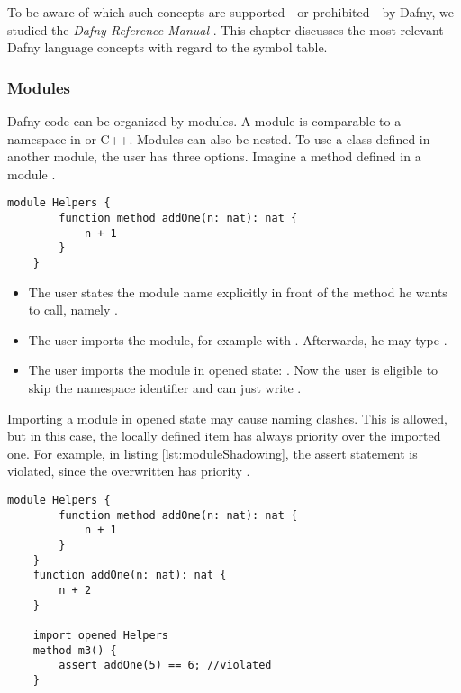 To be aware of which such concepts are supported - or prohibited - by Dafny, we studied the \textit{Dafny Reference Manual} \cite{dafnyReferenceManual}.
This chapter discusses the most relevant Dafny language concepts with regard to the symbol table.

\subsubsection{Modules}
Dafny code can be organized by modules.
A module is comparable to a namespace in \CsharpWithSpace or C++.
Modules can also be nested.
To use a class defined in another module, the user has three options.
Imagine a method  defined in a module .

\begin{lstlisting}[language=dafny, caption={Module Example}, captionpos=b, label={lst:addOneMethod}]
    module Helpers {
        function method addOne(n: nat): nat {
            n + 1
        }
    }
\end{lstlisting}

\begin{itemize}
    \item The user states the module name explicitly in front of the method he wants to call, \linebreak namely .
    \item The user imports the module, for example with .
    Afterwards, he may type .
    \item The user imports the module in opened state: .
    Now the user is eligible to skip the namespace identifier and can just write .
\end{itemize}

Importing a module in opened state may cause naming clashes.
This is allowed, but in this case, the locally defined item has always priority over the imported one.
For example, in listing \ref{lst:moduleShadowing}, the assert statement is violated, since the overwritten  has priority \cite{functionVSMethod}.

\begin{lstlisting}[language = dafny, caption={Naming Clash}, captionpos=b, label={lst:moduleShadowing}]
    module Helpers {
        function method addOne(n: nat): nat {
            n + 1
        }
    }
    function addOne(n: nat): nat {
        n + 2
    }

    import opened Helpers
    method m3() {
        assert addOne(5) == 6; //violated
    }

\end{lstlisting}

